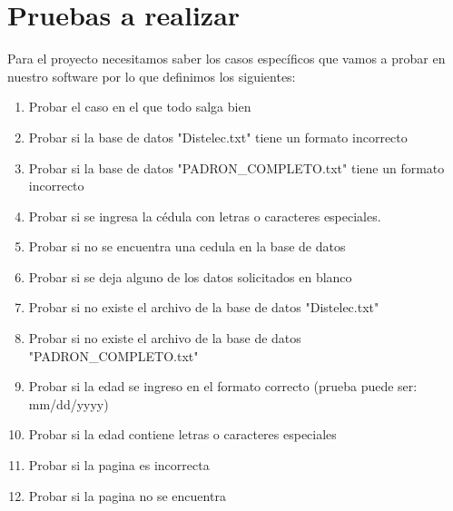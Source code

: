 \documentclass[conference]{IEEEtran}
\begin{document}


\section{Pruebas a realizar}

Para el proyecto necesitamos saber los casos específicos que vamos a probar en nuestro software por lo que definimos los siguientes:

\begin{enumerate}

\item Probar el caso en el que todo salga bien

\item Probar si la base de datos "Distelec.txt" tiene un formato incorrecto

\item Probar si la base de datos "PADRON\_COMPLETO.txt" tiene un formato incorrecto

\item Probar si se ingresa la cédula con letras o caracteres especiales.

\item Probar si no se encuentra una cedula en la base de datos

\item Probar si se deja alguno de los datos solicitados en blanco

\item Probar si no existe el archivo de la base de datos "Distelec.txt"

\item Probar si no existe el archivo de la base de datos "PADRON\_COMPLETO.txt"

\item Probar si la edad se ingreso en el formato correcto (prueba puede ser: mm/dd/yyyy)

\item Probar si la edad contiene letras o caracteres especiales

\item Probar si la pagina es incorrecta 

\item Probar si la pagina no se encuentra

\end{enumerate}
\end{document}
